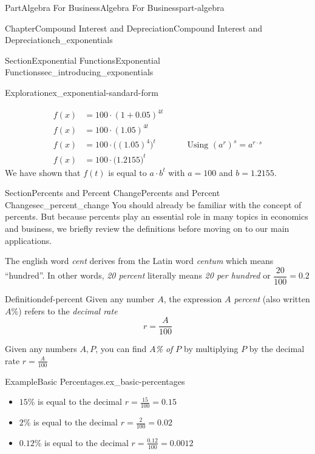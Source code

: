 \documentclass[oneside,10pt,]{tufte-book}
\numberwithin{equation}{chapter}
\newcommand{\amp}{&}
\begin{document}
\begin{partptx}{Part}{Algebra For Business}{}{Algebra For Business}{}{}{part-algebra}
\begin{chapterptx}{Chapter}{Compound Interest and Depreciation}{}{Compound Interest and Depreciation}{}{}{ch_exponentials}
\begin{sectionptx}{Section}{Exponential Functions}{}{Exponential Functions}{}{}{sec_introducing_exponentials}
\begin{exploration}{Exploration}{}{ex_exponential-sandard-form}
\begin{enumerate}[font=\bfseries,label=(\alph*),ref=\alph*]
\begin{align*}
f(x) \amp =  100 \cdot \left(1 + 0.05\right)^{4t} \qquad\amp \\
f(x) \amp =  100 \cdot \left(1.05\right)^{4t} \qquad\amp \\
f(x) \amp =  100 \cdot \Big(\left(1.05\right)^{4}\Big)^t \qquad\amp \text{Using }{\left(a^{r}\right)}^s=  a^{r\cdot s}\\
f(x) \amp =  100 \cdot \Big(1.2155\Big)^t \qquad\amp 
\end{align*}
We have shown that \(f(t)\) is equal to \(a\cdot b^t\) with \(a=100\) and \(b=1.2155\).%
\end{enumerate}%
\end{exploration}%
\end{sectionptx}
%
%
\typeout{************************************************}
\typeout{************************************************}
%
\begin{sectionptx}{Section}{Percents and Percent Change}{}{Percents and Percent Change}{}{}{sec_percent_change}
You should already be familiar with the concept of percents. But because percents play an essential role in many  topics in economics and business, we briefly review the definitions before moving on to our main applications.%
\par
The english word \emph{cent} derives from the Latin word \emph{centum} which means ``hundred''. In other words, \emph{20 percent} literally means \emph{20 per hundred} or \(\dfrac{20}{100} = 0.2\)%
\begin{definition}{Definition}{}{def-percent}%
Given any number \(A\), the expression \emph{\(A\) percent} (also written \(A\)\%) refers to the \emph{decimal rate}%
\begin{equation*}
r = \dfrac{A}{100}
\end{equation*}
%
\par
Given any numbers \(A,P\), you can find \emph{\(A\)\% of \(P\)} by multiplying \(P\) by the decimal rate \(r = \frac{A}{100}\)%
\end{definition}
\begin{example}{Example}{Basic Percentages.}{ex_basic-percentages}%
%
\begin{itemize}[label=\textbullet]
\item{}\(15\)\% is equal to the decimal \(r = \frac{15}{100} = 0.15\)%
\item{}\(2\)\% is equal to the decimal \(r = \frac{2}{100} = 0.02\)%
\item{}\(0.12\)\% is equal to the decimal \(r = \frac{0.12}{100} = 0.0012\)%

\end{itemize}
\end{example}
\end{sectionptx}
\end{chapterptx}
\end{partptx}
\end{document}
